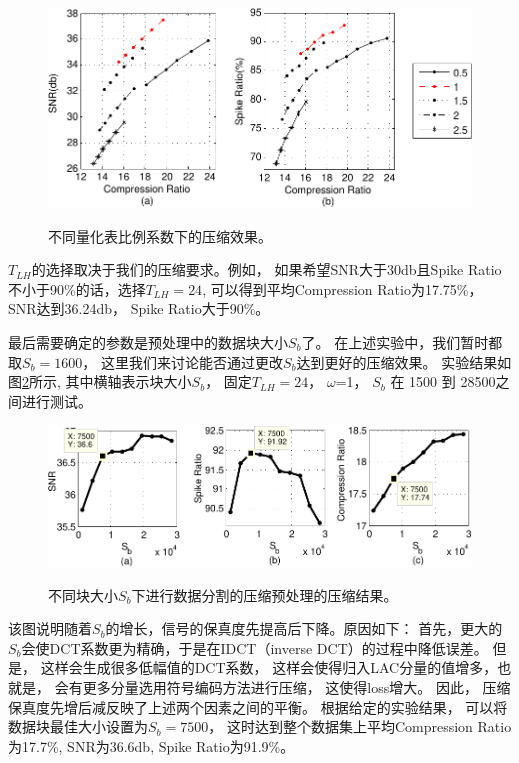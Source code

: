\begin{figure}[htb]
  \centering
  \includegraphics[scale=0.9]{Pictures/Compression/f11-crop.pdf}\\
  \caption{不同量化表比例系数下的压缩效果。 }\label{fig:Comparison:TLH-2}
\end{figure}

$T_{LH}$的选择取决于我们的压缩要求。例如， 如果希望SNR大于30db且Spike Ratio不小于90\%的话，选择$T_{LH}=24$, 可以得到平均Compression Ratio为17.75\%， SNR达到36.24db， Spike Ratio大于90\%。 

最后需要确定的参数是预处理中的数据块大小$S_b$了。 在上述实验中，我们暂时都取$S_b = 1600$， 这里我们来讨论能否通过更改$S_b$达到更好的压缩效果。 实验结果如图\ref{fig:Comparison:Sb}所示, 其中横轴表示块大小$S_b$， 固定$T_{LH}=24$， $\omega$=1，  $S_b$ 在 1500 到 28500之间进行测试。


\begin{figure}[htb]
  \centering
  \includegraphics[scale = 1.1]{Pictures/Compression/f12-crop.pdf}\\
  \caption{不同块大小$S_b$下进行数据分割的压缩预处理的压缩结果。}\label{fig:Comparison:Sb}
\end{figure}


该图说明随着$S_b$的增长，信号的保真度先提高后下降。原因如下：
首先，更大的$S_b$会使DCT系数更为精确，于是在IDCT（inverse DCT）的过程中降低误差。 但是， 这样会生成很多低幅值的DCT系数， 这样会使得归入LAC分量的值增多，也就是， 会有更多分量选用符号编码方法进行压缩， 这使得loss增大。 因此， 压缩保真度先增后减反映了上述两个因素之间的平衡。 根据给定的实验结果， 可以将数据块最佳大小设置为$S_b = 7500$， 这时达到整个数据集上平均Compression Ratio为17.7\%, SNR为36.6db, Spike Ratio为91.9\%。


